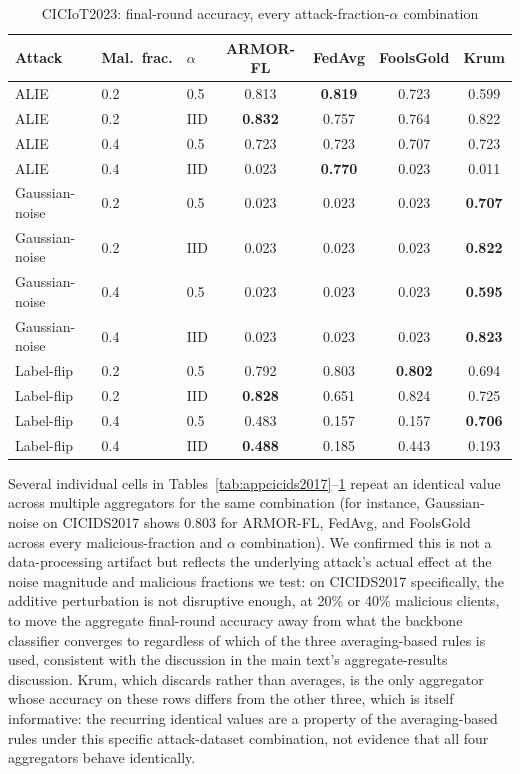 \documentclass[a4paper,11pt]{article}
\begin{document}
\begin{table}[htbp]
\centering
\caption{CICIoT2023: final-round accuracy, every attack-fraction-$\alpha$ combination}\label{tab:appciciot2023}
\begin{tabular}{@{}lllcccc@{}}
\toprule
Attack & Mal.\ frac. & $\alpha$ & ARMOR-FL & FedAvg & FoolsGold & Krum \\
\midrule
ALIE & 0.2 & 0.5 & 0.813 & \textbf{0.819} & 0.723 & 0.599 \\
ALIE & 0.2 & IID & \textbf{0.832} & 0.757 & 0.764 & 0.822 \\
ALIE & 0.4 & 0.5 & 0.723 & 0.723 & 0.707 & 0.723 \\
ALIE & 0.4 & IID & 0.023 & \textbf{0.770} & 0.023 & 0.011 \\
Gaussian-noise & 0.2 & 0.5 & 0.023 & 0.023 & 0.023 & \textbf{0.707} \\
Gaussian-noise & 0.2 & IID & 0.023 & 0.023 & 0.023 & \textbf{0.822} \\
Gaussian-noise & 0.4 & 0.5 & 0.023 & 0.023 & 0.023 & \textbf{0.595} \\
Gaussian-noise & 0.4 & IID & 0.023 & 0.023 & 0.023 & \textbf{0.823} \\
Label-flip & 0.2 & 0.5 & 0.792 & 0.803 & \textbf{0.802}\footnotemark[1] & 0.694 \\
Label-flip & 0.2 & IID & \textbf{0.828} & 0.651 & 0.824 & 0.725 \\
Label-flip & 0.4 & 0.5 & 0.483 & 0.157 & 0.157 & \textbf{0.706} \\
Label-flip & 0.4 & IID & \textbf{0.488} & 0.185 & 0.443 & 0.193 \\
\bottomrule
\end{tabular}
\end{table}

Several individual cells in Tables~\ref{tab:appcicids2017}--\ref{tab:appciciot2023} repeat an identical value across multiple aggregators for the same combination (for instance, Gaussian-noise on CICIDS2017 shows $0.803$ for ARMOR-FL, FedAvg, and FoolsGold across every malicious-fraction and $\alpha$ combination). We confirmed this is not a data-processing artifact but reflects the underlying attack's actual effect at the noise magnitude and malicious fractions we test: on CICIDS2017 specifically, the additive perturbation is not disruptive enough, at 20\% or 40\% malicious clients, to move the aggregate final-round accuracy away from what the backbone classifier converges to regardless of which of the three averaging-based rules is used, consistent with the discussion in the main text's aggregate-results discussion. Krum, which discards rather than averages, is the only aggregator whose accuracy on these rows differs from the other three, which is itself informative: the recurring identical values are a property of the averaging-based rules under this specific attack-dataset combination, not evidence that all four aggregators behave identically.
\end{document}
